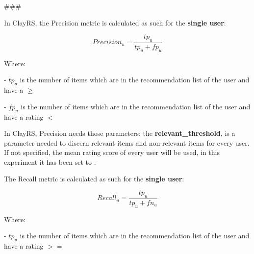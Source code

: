 \usepackage{amsmath}
###


In ClayRS, the Precision metric is calculated as such for the \textbf{single user}:

    \[
    Precision_u = \frac{tp_u}{tp_u + fp_u}
    \]

    Where:

    - $tp_u$ is the number of items which are in the recommendation list of the user and have a
       $\geq$ 
        \textbf{}
        \textbf{}


    - $fp_u$ is the number of items which are in the recommendation list of the user and have a
      rating $<$ 
        \textbf{}
        \textbf{}

\hfill\break

In ClayRS, Precision needs those parameters:
\hfill\break
the \textbf{relevant\_threshold}, is a parameter needed to discern relevant items and non-relevant items for every user.
If not specified, the mean rating score of every user will be used, in this experiment it has been set to
\textbf{}.
\hfill\break



The Recall metric is calculated as such for the \textbf{single user}:

    \[
    Recall_u = \frac{tp_u}{tp_u + fn_u}
    \]

    Where:

    - $tp_u$ is the number of items which are in the recommendation list of the user and have a
      rating $>=$ 
        \textbf{}
        \textbf{}

